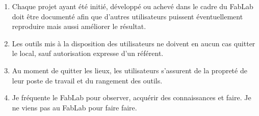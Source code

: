 
\begin{enumerate}
  \item Chaque projet ayant été initié, développé ou achevé dans le cadre du FabLab doit être documenté afin que d'autres utilisateurs puissent éventuellement reproduire mais aussi améliorer le résultat.
  \item Les outils mis à la disposition des utilisateurs ne doivent en aucun cas quitter le local, sauf autorisation expresse d'un référent.
  \item Au moment de quitter les lieux, les utilisateurs s'assurent de la propreté de leur poste de travail et du rangement des outils.
  \item Je fréquente le FabLab pour observer, acquérir des connaissances et faire. Je ne viens pas au FabLab pour faire faire.
\end{enumerate}
